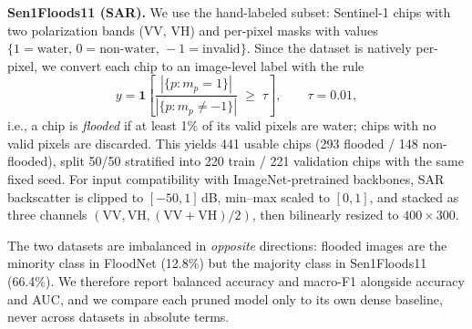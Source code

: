 \documentclass[conference]{IEEEtran}
\newif\ifreview
\newcommand{\REV}[1]{\ifreview\textcolor{red}{\textbf{[Revise: #1]}}\fi}
\begin{document}
\textbf{Sen1Floods11 (SAR).} We use the hand-labeled subset:
Sentinel-1 chips with two polarization bands (VV, VH) and per-pixel
masks with values
$\{1{=}\text{water},\,0{=}\text{non-water},\,-1{=}\text{invalid}\}$.
Since the dataset is natively per-pixel, we convert each chip to an
image-level label with the rule
\begin{equation}
y = \mathbf{1}\!\left[\frac{\left|\{p : m_p = 1\}\right|}
{\left|\{p : m_p \neq -1\}\right|} \;\geq\; \tau\right],
\qquad \tau = 0.01,
\label{eq:labelconv}
\end{equation}
i.e., a chip is \emph{flooded} if at least 1\% of its valid pixels are
water; chips with no valid pixels are discarded. This yields 441
usable chips (293 flooded / 148 non-flooded), split 50/50 stratified
into 220 train / 221 validation chips with the same fixed seed. For
input compatibility with ImageNet-pretrained backbones, SAR
backscatter is clipped to $[-50, 1]$\,dB, min--max scaled to $[0,1]$,
and stacked as three channels $(\mathrm{VV}, \mathrm{VH},
(\mathrm{VV}{+}\mathrm{VH})/2)$, then bilinearly resized to
$400\times300$.
\REV{[B2 -- IMPORTANT] A \emph{random} chip-level split puts chips from
the same flood event (and neighbouring tiles) in both train and
validation $\Rightarrow$ optimistic, correlated evaluation. Sen1Floods11
ships an event-wise split (train/val/test/Bolivia held-out). Run
ResNet18 dense + structured 50\% with an event-wise split (3 seeds) and
report whether the conclusion survives; if it does, this becomes a
strong robustness sentence. [B3] Add a sensitivity analysis for
$\tau\in\{0.01,0.05,0.10\}$ at least for ResNet18 dense, structured
50\%, unstructured 90\% (tiny dataset, runs are cheap). Mention that
$\tau{=}1\%$ yields a very easy ``is there any water'' task for
chips with rivers, and state whether permanent water was excluded.
[A9] Give the clipping range reference and say that the same
normalization is used at train and test time.}

The two datasets are imbalanced in \emph{opposite} directions: flooded
images are the minority class in FloodNet (12.8\%) but the majority
class in Sen1Floods11 (66.4\%). We therefore report balanced accuracy
and macro-F1 alongside accuracy and AUC, and we compare each pruned
model only to its own dense baseline, never across datasets in
absolute terms.
\end{document}
